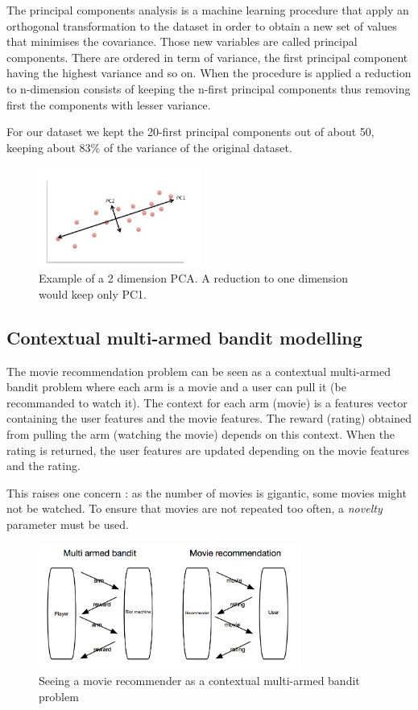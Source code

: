 \documentclass[letterpaper]{article}
\begin{document}
The principal components analysis is a machine learning procedure that apply an orthogonal transformation to the dataset in order to obtain a new set of values that minimises the covariance. Those new variables are called principal components. There are ordered in term of variance, the first principal component having the highest variance and so on. When the procedure is applied a reduction to n-dimension consists of keeping the n-first principal components thus removing first the components with lesser variance.

For our dataset we kept the 20-first principal components out of about 50, keeping about 83\% of the variance of the original dataset.

\begin{figure}[H]
\begin{center}
\includegraphics[width=2.1in]{img/pca.png}
\caption{Example of a 2 dimension PCA. A reduction to one dimension would keep only PC1.}
\label{pca}
\end{center}
\end{figure}

\subsection{Contextual multi-armed bandit modelling}

The movie recommendation problem can be seen as a contextual multi-armed bandit problem where each arm is a movie and a user can pull it (be recommanded to watch it). The context for each arm (movie) is a features vector containing the user features and the movie features. The reward (rating) obtained from pulling the arm (watching the movie) depends on this context. When the rating is returned, the user features are updated depending on the movie features and the rating.

This raises one concern : as the number of movies is gigantic, some movies might not be watched. To ensure that movies are not repeated too often, a \textit{novelty} parameter must be used.

\begin{figure}[H]
\begin{center}
\includegraphics[width=3.4in]{img/schema.png}
\caption{Seeing a movie recommender as a contextual multi-armed bandit problem}
\label{schema}
\end{center}
\end{figure}
\end{document}
